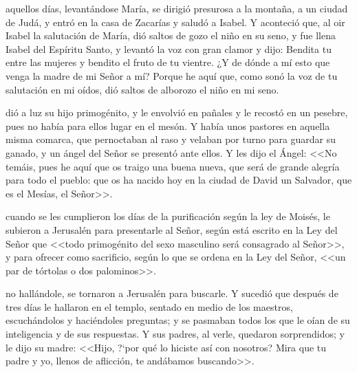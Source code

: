 \documentclass[10pt,oneside]{book}
\begin{document}
 aquellos días, levantándose María, se dirigió presurosa a la montaña, a un ciudad de Judá, y entró en la casa de Zacarías y saludó a Isabel.
Y aconteció que, al oir Isabel la salutación de María, dió saltos de gozo el niño en su seno, y fue llena Isabel del Espíritu Santo, y levantó la voz con gran clamor y dijo:
Bendita tu entre las mujeres y bendito el fruto de tu vientre. ¿Y de dónde a mí esto que venga la madre de mi Señor a mí? Porque he aquí que, como sonó la voz de tu salutación en mi oídos,
dió saltos de alborozo el niño en mi seno.

\begin{center}
      
\end{center}

 dió a luz su hijo primogénito, y le envolvió en pañales y le recostó en un pesebre, pues no había para ellos lugar en el mesón.
Y había unos pastores en aquella misma comarca, que pernoctaban al raso y velaban por turno para guardar su ganado, y un ángel del Señor se presentó ante ellos.
Y les dijo el Ángel: <<No temáis, pues he aquí que os traigo una buena nueva, que será de grande alegría para todo el pueblo: 
que os ha nacido hoy en la ciudad de David un Salvador, que es el Mesías, el Señor>>.

\begin{center}
      
\end{center}

 cuando se les cumplieron los días de la purificación según la ley de Moisés, le subieron a Jerusalén para presentarle al Señor,
según está escrito en la Ley del Señor que <<todo primogénito del sexo masculino será consagrado al Señor>>, y para ofrecer como sacrificio,
según lo que se ordena en la Ley del Señor, <<un par de tórtolas o dos palominos>>.

\begin{center}
      
\end{center}

 no hallándole, se tornaron a Jerusalén para buscarle. Y sucedió que después de tres días le hallaron en el templo,
sentado en medio de los maestros, escuchándolos y haciéndoles preguntas; y se pasmaban todos los que le oían de su inteligencia y de sus respuestas.
Y sus padres, al verle, quedaron sorprendidos; y le dijo su madre: <<Hijo, {?`}por qué lo hiciste así con nosotros? Mira que tu padre y yo, llenos de aflicción, 
te andábamos buscando>>.
\end{document}
